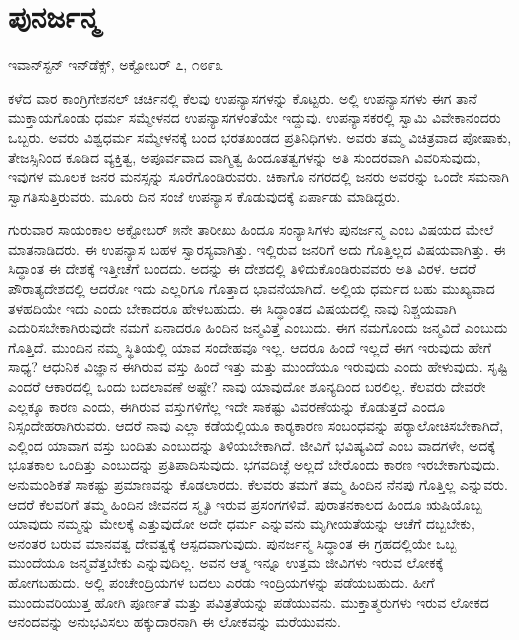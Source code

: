 \section{ಪುನರ್ಜನ್ಮ }

\begin{flushright}
ಇವಾನ್‍ಸ್ಟನ್ ಇನ್‍ಡೆಕ್ಸ್, ಅಕ್ಟೋಬರ್ ೭, ೧೮೯೩
\end{flushright}

ಕಳೆದ ವಾರ ಕಾಂಗ್ರಿಗೇಶನಲ್ ಚರ್ಚಿನಲ್ಲಿ ಕೆಲವು ಉಪನ್ಯಾಸಗಳನ್ನು ಕೊಟ್ಟರು. ಅಲ್ಲಿ ಉಪನ್ಯಾಸಗಳು ಈಗ ತಾನೆ ಮುಕ್ತಾಯಗೊಂಡು ಧರ್ಮ ಸಮ್ಮೇಳನದ ಉಪನ್ಯಾಸಗಳಂತೆಯೇ ಇದ್ದುವು. ಉಪನ್ಯಾಸಕರಲ್ಲಿ ಸ್ವಾಮಿ ವಿವೇಕಾನಂದರು ಒಬ್ಬರು. ಅವರು ವಿಶ್ವಧರ್ಮ ಸಮ್ಮೇಳನಕ್ಕೆ ಬಂದ ಭರತಖಂಡದ ಪ್ರತಿನಿಧಿಗಳು. ಅವರು ತಮ್ಮ ವಿಚಿತ್ರವಾದ ಪೋಷಾಕು, ತೇಜಸ್ಸಿನಿಂದ ಕೂಡಿದ ವ್ಯಕ್ತಿತ್ವ, ಅಪೂರ್ವವಾದ ವಾಗ್ಮಿತ್ವ ಹಿಂದೂತತ್ವಗಳನ್ನು ಅತಿ ಸುಂದರವಾಗಿ ವಿವರಿಸುವುದು, ಇವುಗಳ ಮೂಲಕ ಜನರ ಮನಸ್ಸನ್ನು ಸೂರೆಗೊಂಡಿರುವರು. ಚಿಕಾಗೊ ನಗರದಲ್ಲಿ ಜನರು ಅವರನ್ನು ಒಂದೇ ಸಮನಾಗಿ ಸ್ವಾಗತಿಸುತ್ತಿರುವರು. ಮೂರು ದಿನ ಸಂಜೆ ಉಪನ್ಯಾಸ ಕೊಡುವುದಕ್ಕೆ ಏರ್ಪಾಡು ಮಾಡಿದ್ದರು. 

 ಗುರುವಾರ ಸಾಯಂಕಾಲ ಅಕ್ಟೋಬರ್ ೫ನೇ ತಾರೀಖು ಹಿಂದೂ ಸಂನ್ಯಾಸಿಗಳು ಪುನರ್ಜನ್ಮ ಎಂಬ ವಿಷಯದ ಮೇಲೆ ಮಾತನಾಡಿದರು. ಈ ಉಪನ್ಯಾಸ ಬಹಳ ಸ್ವಾರಸ್ಯವಾಗಿತ್ತು. ಇಲ್ಲಿರುವ ಜನರಿಗೆ ಅದು ಗೊತ್ತಿಲ್ಲದ ವಿಷಯವಾಗಿತ್ತು. ಈ ಸಿದ್ಧಾಂತ ಈ ದೇಶಕ್ಕೆ ಇತ್ತೀಚೆಗೆ ಬಂದದು. ಅದನ್ನು ಈ ದೇಶದಲ್ಲಿ ತಿಳಿದುಕೊಂಡಿರುವವರು ಅತಿ ವಿರಳ. ಆದರೆ ಪೌರಾತ್ಯದೇಶದಲ್ಲಿ ಆದರೋ ಇದು ಎಲ್ಲರಿಗೂ ಗೊತ್ತಾದ ಭಾವನೆಯಾಗಿದೆ. ಅಲ್ಲಿಯ ಧರ್ಮದ ಬಹು ಮುಖ್ಯವಾದ ತಳಹದಿಯೇ ಇದು ಎಂದು ಬೇಕಾದರೂ ಹೇಳಬಹುದು. ಈ ಸಿದ್ಧಾಂತದ ವಿಷಯದಲ್ಲಿ ನಾವು ನಿಶ್ಚಯವಾಗಿ ಎದುರಿಸಬೇಕಾಗಿರುವುದೇ ನಮಗೆ ಏನಾದರೂ ಹಿಂದಿನ ಜನ್ಮವಿತ್ತೆ ಎಂಬುದು. ಈಗ ನಮಗೊಂದು ಜನ್ಮವಿದೆ ಎಂಬುದು ಗೊತ್ತಿದೆ. ಮುಂದಿನ ನಮ್ಮ ಸ್ಥಿತಿಯಲ್ಲಿ ಯಾವ ಸಂದೇಹವೂ ಇಲ್ಲ. ಆದರೂ ಹಿಂದೆ ಇಲ್ಲದೆ ಈಗ ಇರುವುದು ಹೇಗೆ ಸಾಧ್ಯ? ಆಧುನಿಕ ವಿಜ್ಞಾನ ಈಗಿರುವ ವಸ್ತು ಹಿಂದೆ ಇತ್ತು ಮತ್ತು ಮುಂದೆಯೂ ಇರುವುದು ಎಂದು ಹೇಳುವುದು. ಸೃಷ್ಟಿ ಎಂದರೆ ಆಕಾರದಲ್ಲಿ ಒಂದು ಬದಲಾವಣೆ ಅಷ್ಟೇ? ನಾವು ಯಾವುದೋ ಶೂನ್ಯದಿಂದ ಬರಲಿಲ್ಲ. ಕೆಲವರು ದೇವರೇ ಎಲ್ಲಕ್ಕೂ ಕಾರಣ ಎಂದು, ಈಗಿರುವ ವಸ್ತುಗಳಿಗೆಲ್ಲ ಇದೇ ಸಾಕಷ್ಟು ವಿವರಣೆಯನ್ನು ಕೊಡುತ್ತದೆ ಎಂದೂ ನಿಸ್ಸಂದೇಹರಾಗಿರುವರು. ಆದರೆ ನಾವು ಎಲ್ಲಾ ಕಡೆಯಲ್ಲಿಯೂ ಕಾರ‍್ಯಕಾರಣ ಸಂಬಂಧವನ್ನು ಪರ‍್ಯಾಲೋಚಿಸಬೇಕಾಗಿದೆ, ಎಲ್ಲಿಂದ ಯಾವಾಗ ವಸ್ತು ಬಂದಿತು ಎಂಬುದನ್ನು ತಿಳಿಯಬೇಕಾಗಿದೆ. ಜೀವಿಗೆ ಭವಿಷ್ಯವಿದೆ ಎಂಬ ವಾದಗಳೇ, ಅದಕ್ಕೆ ಭೂತಕಾಲ ಒಂದಿತ್ತು ಎಂಬುದನ್ನು ಪ್ರತಿಪಾದಿಸುವುದು. ಭಗವದಿಚ್ಛೆ ಅಲ್ಲದೆ ಬೇರೊಂದು ಕಾರಣ ಇರಬೇಕಾಗುವುದು. ಅನುಮಂಶಿಕತೆ ಸಾಕಷ್ಟು ಪ್ರಮಾಣವನ್ನು ಕೊಡಲಾರದು. ಕೆಲವರು ತಮಗೆ ತಮ್ಮ ಹಿಂದಿನ ನೆನಪು ಗೊತ್ತಿಲ್ಲ ಎನ್ನುವರು. ಆದರೆ ಕೆಲವರಿಗೆ ತಮ್ಮ ಹಿಂದಿನ ಜೀವನದ ಸ್ಮೃತಿ ಇರುವ ಪ್ರಸಂಗಗಳಿವೆ. ಪುರಾತನಕಾಲದ ಹಿಂದೂ ಋಷಿಯೊಬ್ಬ ಯಾವುದು ನಮ್ಮನ್ನು ಮೇಲಕ್ಕೆ ಎತ್ತುವುದೋ ಅದೇ ಧರ್ಮ ಎನ್ನುವನು ಮೃಗೀಯತೆಯನ್ನು ಆಚೆಗೆ ದಬ್ಬಬೇಕು, ಅನಂತರ ಬರುವ ಮಾನವತ್ವ ದೇವತ್ವಕ್ಕೆ ಆಸ್ಪದವಾಗುವುದು. ಪುನರ್ಜನ್ಮ ಸಿದ್ಧಾಂತ ಈ ಗ್ರಹದಲ್ಲಿಯೇ ಒಬ್ಬ ಮುಂದೆಯೂ ಜನ್ಮವೆತ್ತಬೇಕು ಎನ್ನುವುದಿಲ್ಲ. ಅವನ ಆತ್ಮ ಇನ್ನೂ ಉತ್ತಮ ಜೀವಿಗಳು ಇರುವ ಲೋಕಕ್ಕೆ ಹೋಗಬಹುದು. ಅಲ್ಲಿ ಪಂಚೇಂದ್ರಿಯಗಳ ಬದಲು ಎರಡು ಇಂದ್ರಿಯಗಳನ್ನು ಪಡೆಯಬಹುದು. ಹೀಗೆ ಮುಂದುವರಿಯುತ್ತ ಹೋಗಿ ಪೂರ್ಣತೆ ಮತ್ತು ಪವಿತ್ರತೆಯನ್ನು ಪಡೆಯುವನು. ಮುಕ್ತಾತ್ಮರುಗಳು ಇರುವ ಲೋಕದ ಆನಂದವನ್ನು ಅನುಭವಿಸಲು ಹಕ್ಕುದಾರನಾಗಿ ಈ ಲೋಕವನ್ನು ಮರೆಯುವನು.


